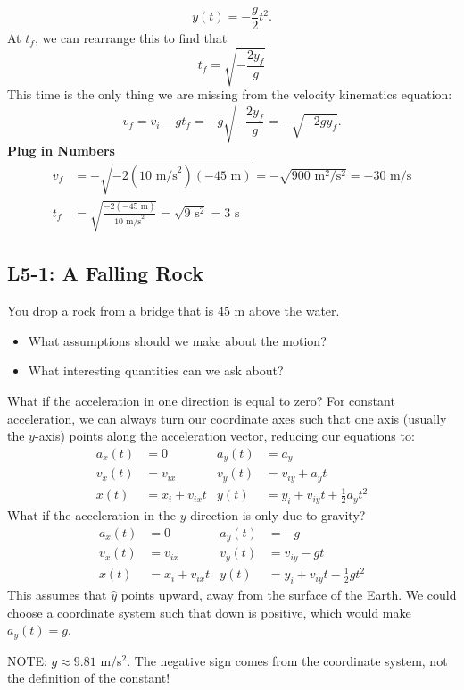 \documentclass[]{article}
\begin{document}
\begin{TeacherMargin}
\[
y(t) =  -\frac{g}{2}t^{2}.
\]
At $t_{f}$, we can rearrange this to find that
\[
t_{f} = \sqrt{-\frac{2y_{f}}{g}}
\]
This time is the only thing we are missing from the velocity kinematics equation:
\[
v_{f} = v_{i} - gt_{f} = -g\sqrt{-\frac{2y_{f}}{g}} = -\sqrt{-2gy_{f}}.
\]
\textbf{Plug in Numbers}
\begin{align*}
	v_{f} & = -\sqrt{-2(10\text{ m/s}^{2})(-45\text{ m})} = -\sqrt{900\text{ m}^{2}/\text{s}^{2}} = -30 \text{ m/s} \\
	t_{f} & = \sqrt{\frac{-2(-45\text{ m})}{10\text{ m/s}^{2}}} = \sqrt{9\text{ s}^{2}} = 3\text{ s}
\end{align*}
\end{TeacherMargin}
\begin{PresentSpace}
\vspace{-10pt}
\section*{L5-1: A Falling Rock}
\vspace{-10pt}
You drop a rock from a bridge that is 45 m above the water.
\begin{itemize}
	\item What assumptions should we make about the motion?
	\item What interesting quantities can we ask about?
\end{itemize}
\end{PresentSpace}
\newpage
\begin{TeacherMargin}
\noindent What if the acceleration in one direction is equal to zero? For constant acceleration, we can always turn our coordinate axes such that one axis (usually the $y$-axis) points along the acceleration vector, reducing our equations to:
\begin{align*}
	a_{x}(t) & = 0 & a_{y}(t) & = a_{y} \\
	v_{x}(t) & = v_{ix} & v_{y}(t) & = v_{iy}+a_{y}t \\
	x(t) & = x_{i}+v_{ix}t & y(t) & = y_{i}+v_{iy}t+\frac{1}{2}a_{y}t^{2}
\end{align*}
What if the acceleration in the $y$-direction is only due to gravity?
\begin{align*}
	a_{x}(t) & = 0 & a_{y}(t) & = -g \\
	v_{x}(t) & = v_{ix} & v_{y}(t) & = v_{iy}-gt \\
	x(t) & = x_{i}+v_{ix}t & y(t) & = y_{i}+v_{iy}t-\frac{1}{2}gt^{2}
\end{align*}
This assumes that $\hat{y}$ points upward, away from the surface of the Earth. We could choose a coordinate system such that down is positive, which would make $a_{y}(t) = g$.

\noindent NOTE: $g\approx9.81$ m/s$^{2}$. The negative sign comes from the coordinate system, not the definition of the constant!
\end{TeacherMargin}
\end{document}
